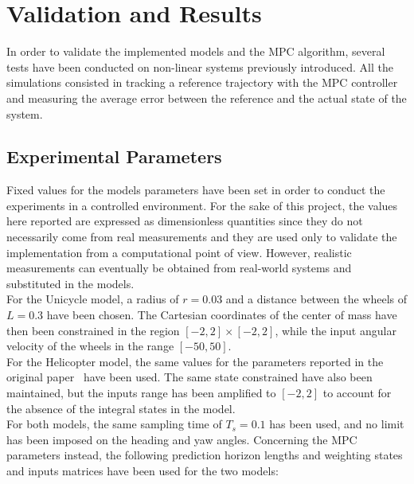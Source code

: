 \documentclass[../main.tex]{subfiles}
\begin{document}
\section{Validation and Results}\label{sec:results}

In order to validate the implemented models and the MPC algorithm, several tests
have been conducted on non-linear systems previously introduced. All the simulations
consisted in tracking a reference trajectory with the MPC controller and
measuring the average error between the reference and the actual state of the
system.

\subsection{Experimental Parameters}

Fixed values for the models parameters have been set in order to conduct the
experiments in a controlled environment. For the sake of this project, the
values here reported are expressed as dimensionless quantities since they do not
necessarily come from real measurements and they are used only to validate the
implementation from a computational point of view. However, realistic measurements can eventually be obtained from real-world systems and substituted in the models.\\
For the Unicycle model, a radius of $r = 0.03$ and a distance
between the wheels of $L = 0.3$ have been chosen. The Cartesian coordinates of
the center of mass have then been constrained in the region $[-2, 2] \times [-2,
2]$, while the input angular velocity of the wheels in the range $[-50, 50]$.\\
For the Helicopter model, the same values for the parameters reported in the
original paper~\cite{helicopter} have been used. The same state constrained have
also been maintained, but the inputs range has been amplified to $[-2, 2]$ to
account for the absence of the integral states in the model.\\
For both models, the same sampling time of $T_s = 0.1$ has been used, and no
limit has been imposed on the heading and yaw angles. Concerning the MPC
parameters instead, the following prediction horizon lengths and weighting
states and inputs matrices have been used for the two models:
\end{document}
